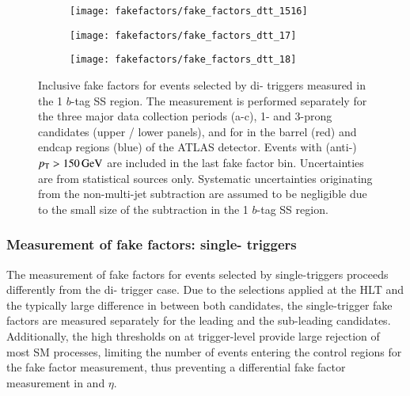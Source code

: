 \begin{figure}[htbp]
  \centering

  \begin{subfigure}{0.495\textwidth}
    \texttt{[image: fakefactors/fake\_factors\_dtt\_1516]}
  \end{subfigure}
  \begin{subfigure}{0.495\textwidth}
    \texttt{[image: fakefactors/fake\_factors\_dtt\_17]}
  \end{subfigure}

  \begin{subfigure}{0.495\textwidth}
    \texttt{[image: fakefactors/fake\_factors\_dtt\_18]}
  \end{subfigure}

  \caption{Inclusive fake factors for events selected by di-\tauhadvis
    triggers measured in the 1 $b$-tag SS region. The measurement is
    performed separately for the three major data collection periods
    (a-c), 1- and 3-prong \tauhadvis candidates (upper / lower
    panels), and for \tauhadvis in the barrel (red) and endcap regions
    (blue) of the ATLAS detector. Events with (anti-)\tauhadvis
    $p_{\text{T}} > \SI{150}{\ensuremath{\text{GeV}}}$ are included in the last fake factor
    bin. Uncertainties are from statistical sources only. Systematic
    uncertainties originating from the non-multi-jet subtraction are
    assumed to be negligible due to the small size of the subtraction
    in the 1 $b$-tag SS region.}
  \label{fig:mjfakes_fake_factors}
\end{figure}


\subsubsection{Measurement of fake factors: single-\tauhadvis
  triggers}

The measurement of fake factors for events selected by
single-\tauhadvis triggers proceeds differently from the di-\tauhadvis
trigger case. Due to the selections applied at the HLT and the
typically large difference in \pT between both \tauhadvis candidates,
the single-\tauhadvis trigger fake factors are measured separately for
the leading and the sub-leading \tauhadvis candidates. Additionally,
the high \pT thresholds on \tauhadvis at trigger-level provide large
rejection of most SM processes, limiting the number of events entering
the control regions for the fake factor measurement, thus preventing a
differential fake factor measurement in \tauhadvis \pT and $\eta$.

